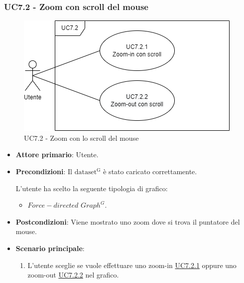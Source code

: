 \subsubsection{UC7.2 - Zoom con scroll del mouse}
\label{sec:UC7.2}
\begin{figure}[h!]
    \centering
    \includegraphics[scale=0.60]{../../assets/UC7.2.png}
    \caption{UC7.2 - Zoom con lo scroll del mouse}
\end{figure}
\begin{itemize}
    \item \textbf{Attore primario}: Utente.
    \item \textbf{Precondizioni}: Il ${\mathrm{dataset^{G}}}$ è stato caricato correttamente. \par L'utente ha scelto la seguente tipologia di grafico:
    \begin{itemize}
          \item $Force-directed$ $Graph^{G}$.
    \end{itemize}
    \item \textbf{Postcondizioni}: Viene mostrato uno zoom dove si trova il puntatore del mouse.
    \item \textbf{Scenario principale}:
            \begin{enumerate}
                \item L'utente sceglie se vuole effettuare uno zoom-in \hyperref[sec:UC7.2.1]{UC7.2.1} oppure uno zoom-out \hyperref[sec:UC7.2.2]{UC7.2.2} nel grafico.
            \end{enumerate}
\end{itemize}

